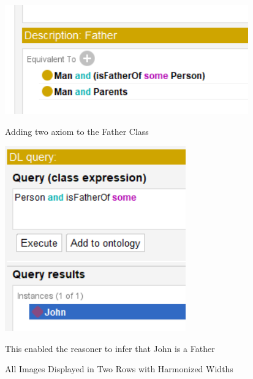 \begin{figure}[H]
    \begin{minipage}[b]{0.4\textwidth}
        \centering
        \includegraphics[width=\textwidth]{images/1.1 - tuto/q4 - adding an axiom to father .png}
        \caption{Adding two axiom to the Father Class}
        \label{fig:image4}
    \end{minipage}
    \hfill
    \begin{minipage}[b]{0.25\textwidth}
        \centering
        \includegraphics[width=\textwidth]{images/1.1 - tuto/q5 - now q3 works .png}
        \caption{This enabled the reasoner to infer that John is a Father}
        \label{fig:image5}
    \end{minipage}
    \caption{All Images Displayed in Two Rows with Harmonized Widths}
    \label{fig:allimages}
\end{figure}